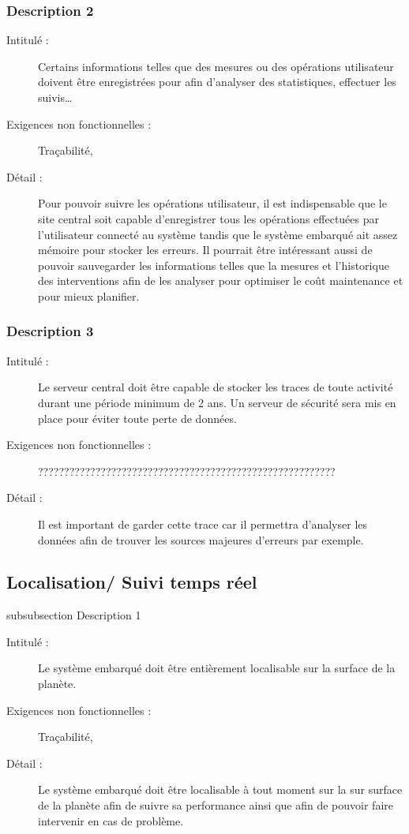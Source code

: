 \subsubsection {Description 2}
\begin{description}
           \item[Intitulé :] Certains informations telles que des mesures ou des opérations utilisateur doivent être enregistrées pour afin d’analyser des statistiques, effectuer les suivis… 
           \item[Exigences non fonctionnelles :] Traçabilité, 
           \item[Détail :] Pour pouvoir suivre les opérations utilisateur, il est indispensable que le site central soit capable d’enregistrer tous les opérations effectuées par l’utilisateur connecté au système tandis que le système embarqué ait assez mémoire pour stocker les erreurs. Il pourrait être intéressant aussi de pouvoir sauvegarder les informations telles que la mesures et l’historique des interventions afin de les analyser pour optimiser le coût maintenance et pour mieux planifier. 
\end{description}

\subsubsection {Description 3}
\begin{description}
           \item[Intitulé :] Le serveur central doit être capable de stocker les traces de toute activité durant une période minimum de 2 ans. Un serveur de sécurité sera mis en place pour éviter toute perte de données. 
           \item[Exigences non fonctionnelles :] ?????????????????????????????????????????????????????????
           \item[Détail :] Il est important de garder cette trace car il permettra d’analyser les données afin de trouver les sources majeures d’erreurs par exemple. 
\end{description}


\subsection {Localisation/ Suivi temps réel}
subsubsection {Description 1}
\begin{description}
           \item[Intitulé :] Le système embarqué doit être entièrement localisable sur la surface de la planète. 
           \item[Exigences non fonctionnelles :] Traçabilité, 
           \item[Détail :] Le système embarqué doit être localisable à tout moment sur la sur surface de la planète afin de suivre sa performance ainsi que afin de pouvoir faire intervenir en cas de problème. 
\end{description}

